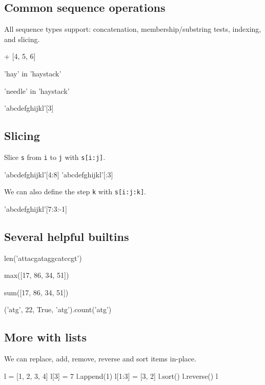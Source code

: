\documentclass[aspectratio=1610,slidestop]{beamer}
\begin{document}
\subsection{Common sequence operations}
\begin{pframe}
All sequence types support: concatenation, membership/substring tests,
indexing, and slicing.
\begin{pyconsole}
[1, 2, 3] + [4, 5, 6]

'hay' in 'haystack'

'needle' in 'haystack'

'abcdefghijkl'[3]
\end{pyconsole}
\end{pframe}


\subsection{Slicing}
\begin{pframe}
 Slice \texttt{s} from \texttt{i} to
 \texttt{j} with \texttt{s[i:j]}.
\begin{pyconsole}
'abcdefghijkl'[4:8]
'abcdefghijkl'[:3]
\end{pyconsole}
\medskip
\medskip
 We can also define the step \texttt{k} with
 \texttt{s[i:j:k]}.
\begin{pyconsole}
'abcdefghijkl'[7:3:-1]
\end{pyconsole}
\end{pframe}


\subsection{Several helpful builtins}
\begin{pframe}
\begin{pyconsole}
len('attacgataggcatccgt')

max([17, 86, 34, 51])

sum([17, 86, 34, 51])

('atg', 22, True, 'atg').count('atg')
\end{pyconsole}
\end{pframe}


\subsection{More with lists}
\begin{pframe}
 We can replace, add, remove, reverse and sort items in-place.
\begin{pyconsole}
l = [1, 2, 3, 4]
l[3] = 7
l.append(1)
l[1:3] = [3, 2]
l.sort()
l.reverse()
l
\end{pyconsole}
\end{pframe}
\end{document}
